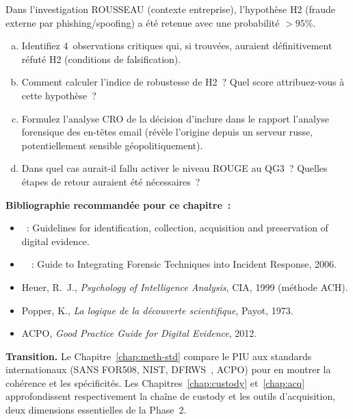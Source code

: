 \begin{boxexo}[title={\ding{45}\quad Exercice~6.3. Falsification active \niveauexpert}]
Dans l'investigation ROUSSEAU (contexte entreprise), l'hypothèse H2
(fraude externe par phishing/spoofing) a été retenue avec une probabilité
$> 95\%$.

\begin{enumerate}[(a)]
    \item Identifiez 4~observations critiques qui, si trouvées, auraient
          définitivement réfuté H2 (conditions de falsification).
    \item Comment calculer l'indice de robustesse de H2~? Quel score
          attribuez-vous à cette hypothèse~?
    \item Formulez l'analyse CRO de la décision d'inclure dans le rapport
          l'analyse forensique des en-têtes email (révèle l'origine depuis
          un serveur russe, potentiellement sensible géopolitiquement).
    \item Dans quel cas aurait-il fallu activer le niveau ROUGE au QG3~?
          Quelles étapes de retour auraient été nécessaires~?
\end{enumerate}
\end{boxexo}

\bigskip

\begin{boxinfo}
\textbf{Bibliographie recommandée pour ce chapitre~:}
\begin{itemize}
    \item {}~: Guidelines for identification,
          collection, acquisition and preservation of digital evidence.
    \item {}~\cite{nist80086}~: Guide to Integrating Forensic Techniques
          into Incident Response, 2006.
    \item Heuer, R.~J.,
          \textit{Psychology of Intelligence Analysis},
          CIA, 1999 (méthode ACH). \cite{heuer1999}
    \item Popper, K., \textit{La logique de la découverte scientifique},
          Payot, 1973. \cite{popper1973}
    \item ACPO, \textit{Good Practice Guide for Digital Evidence}, 2012.
\end{itemize}
\textbf{Transition.} Le Chapitre~\ref{chap:meth-std} compare le PIU aux
standards internationaux (SANS FOR508, NIST, DFRWS~\cite{dfrws2001}, ACPO) pour en
montrer la cohérence et les spécificités. Les Chapitres~\ref{chap:custody}
et~\ref{chap:acq} approfondissent respectivement la chaîne de custody
et les outils d'acquisition, deux dimensions essentielles de la Phase~2.
\end{boxinfo}